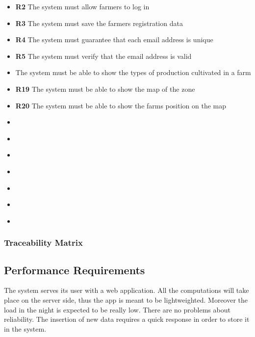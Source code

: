 \begin{itemize}
\begin{enumerate}
\begin{itemize}
            \item \textbf{R2} The system must allow farmers to log in\\
            \item \textbf{R3} The system must save the farmers registration data\\
            \item \textbf{R4} The system must guarantee that each email address is unique\\
            \item \textbf{R5} The system must verify that the email address is valid\\
            \item \textbf{} The system must be able to show the types of production cultivated in a farm\\
            \item \textbf{R19} The system must be able to show the map of the zone\\
            \item \textbf{R20} The system must be able to show the farms position on the map\\
            \item \textbf{}
            \item \textbf{}
            \item \textbf{}
            \item \textbf{}
            \item \textbf{}
            \item \textbf{}
            \item \textbf{}
        \end{itemize}
    \end{enumerate}
\end{itemize}
    
\textbf{}
    \textbf{}
    \textbf{}
    \textbf{}
    \textbf{}
    \textbf{}
    \textbf{}
    \textbf{}
    \textbf{}
    \textbf{}
    \textbf{}
    \textbf{}



\subsubsection{Traceability Matrix}
\subsection{Performance Requirements}
The system serves its user with a web application. All the computations will take place on the server side, 
thus the app is meant to be lightweighted. Moreover the load in the night is expected to be really low.
There are no problems about reliability. The insertion of new data requires a quick response in order to store 
it in the system.

